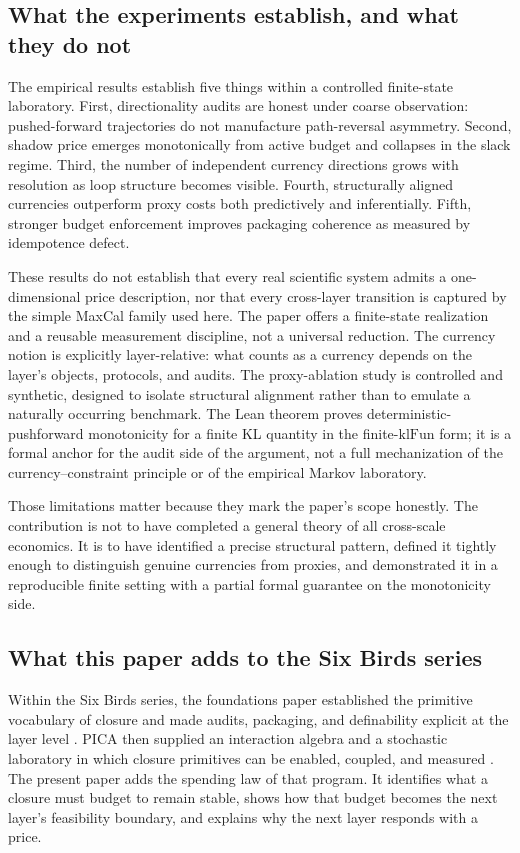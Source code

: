 \subsection{What the experiments establish, and what they do not}

The empirical results establish five things within a controlled finite-state laboratory. First, directionality audits are honest under coarse observation: pushed-forward trajectories do not manufacture path-reversal asymmetry. Second, shadow price emerges monotonically from active budget and collapses in the slack regime. Third, the number of independent currency directions grows with resolution as loop structure becomes visible. Fourth, structurally aligned currencies outperform proxy costs both predictively and inferentially. Fifth, stronger budget enforcement improves packaging coherence as measured by idempotence defect.

These results do not establish that every real scientific system admits a one-dimensional price description, nor that every cross-layer transition is captured by the simple MaxCal family used here. The paper offers a finite-state realization and a reusable measurement discipline, not a universal reduction. The currency notion is explicitly layer-relative: what counts as a currency depends on the layer's objects, protocols, and audits. The proxy-ablation study is controlled and synthetic, designed to isolate structural alignment rather than to emulate a naturally occurring benchmark. The Lean theorem proves deterministic-pushforward monotonicity for a finite KL quantity in the finite-\(\mathrm{klFun}\) form; it is a formal anchor for the audit side of the argument, not a full mechanization of the currency--constraint principle or of the empirical Markov laboratory.

Those limitations matter because they mark the paper's scope honestly. The contribution is not to have completed a general theory of all cross-scale economics. It is to have identified a precise structural pattern, defined it tightly enough to distinguish genuine currencies from proxies, and demonstrated it in a reproducible finite setting with a partial formal guarantee on the monotonicity side.

\subsection{What this paper adds to the Six Birds series}

Within the Six Birds series, the foundations paper established the primitive vocabulary of closure and made audits, packaging, and definability explicit at the layer level \cite{tsiokos2026sixbirds}. PICA then supplied an interaction algebra and a stochastic laboratory in which closure primitives can be enabled, coupled, and measured \cite{tsiokos2026create}. The present paper adds the spending law of that program. It identifies what a closure must budget to remain stable, shows how that budget becomes the next layer's feasibility boundary, and explains why the next layer responds with a price.

